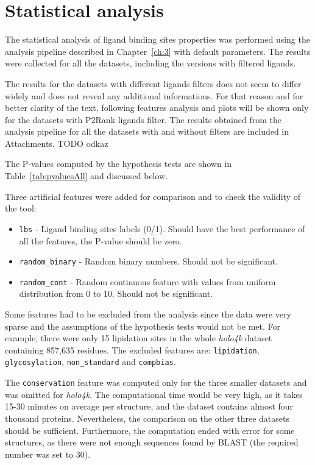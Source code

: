 \newpage
\section{Statistical analysis}

The statistical analysis of ligand binding sites properties was performed using the analysis pipeline described in Chapter~\ref{ch:3} with default parameters. The results were collected for all the datasets, including the versions with filtered ligands.

The results for the datasets with different ligands filters does not seem to differ widely and does not reveal any additional informations. For that reason and for better clarity of the text, following features analysis and plots will be shown only for the datasets with P2Rank ligands filter. The results obtained from the analysis pipeline for all the datasets with and without filters are included in Attachments. TODO odkaz

The P-values computed by the hypothesis tests are shown in Table~\ref{tab:pvaluesAll} and discussed below.

Three artificial features were added for comparison and to check the validity of the tool:
\begin{itemize}
  \item \texttt{lbs} - Ligand binding sites labels (0/1). Should have the best performance of all the features, the P-value should be zero.
  \item \texttt{random\_binary} - Random binary numbers. Should not be significant.
  \item \texttt{random\_cont} - Random continuous feature with values from uniform distribution from 0 to 10. Should not be significant.
\end{itemize}

Some features had to be excluded from the analysis since the data were very sparse and the assumptions of the hypothesis tests would not be met. For example, there were only 15 lipidation sites in the whole \textit{holo4k} dataset containing  857,635 residues. The excluded features are: \texttt{lipidation}, \texttt{glycosylation}, \texttt{non\_standard} and \texttt{compbias}.

The \texttt{conservation} feature was computed only for the three smaller datasets and was omitted for \textit{holo4k}. The computational time would be very high, as it takes 15-30 minutes on average per structure, and the dataset contains almost four thousand proteins. Nevertheless, the comparison on the other three datasets should be sufficient. Furthermore, the computation ended with error for some structures, as there were not enough sequences found by BLAST (the required number was set to 30).

